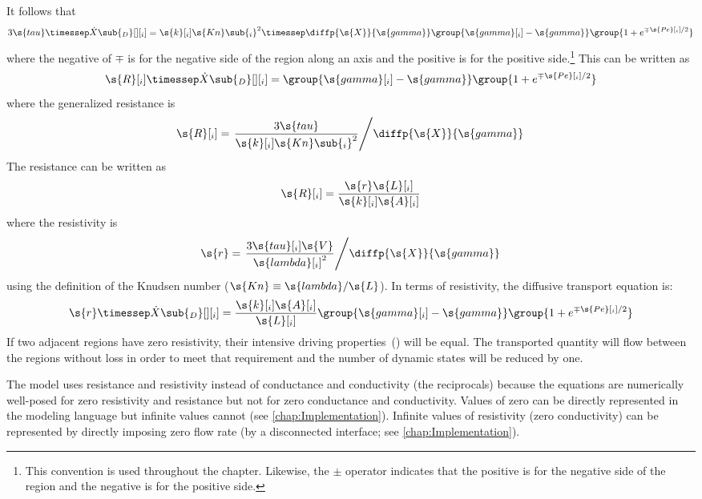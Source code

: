 It follows that
\begin{equation}
  \label{eq:DiffusiveTransport2}
  3\s{tau}\timessep\dot{X}\sub{_D}[ ][_i] = \s{k}[_i]\s{Kn}\sub{_i}^2\timessep\diffp{\s{X}}{\s{gamma}}\group{\s{gamma}[_i] - \s{gamma}}\group{1 + e^{\mp\s{Pe}[_i]/2}}
\end{equation}
where the negative of $\mp$ is for the negative side of the region along an axis and the positive is for the positive side.\footnote{This convention is used throughout the chapter.  Likewise, the $\pm$ operator indicates that the positive is for the negative side of the region and the negative is for the positive side.}  This can be written as
\begin{equation}
  \label{eq:DiffusiveTransport3}
  \s{R}[_i]\timessep\dot{X}\sub{_D}[ ][_i] = \group{\s{gamma}[_i] - \s{gamma}}\group{1 + e^{\mp\s{Pe}[_i]/2}}
\end{equation}
where the generalized resistance is
\begin{equation}
  \label{eq:Resistance1}
  \s{R}[_i]= \left.\frac{3\s{tau}}{\s{k}[_i]\s{Kn}\sub{_i}^2}\middle/\diffp{\s{X}}{\s{gamma}}\right.
\end{equation}
The resistance can be written as
\begin{equation}
  \label{eq:Resistance2}
  \s{R}[_i]= \frac{\s{r}\s{L}[_i]}{\s{k}[_i]\s{A}[_i]}
\end{equation}
where the resistivity is
\begin{equation}
  \label{eq:Resistivity}
  \s{r} = \left.\frac{3\s{tau}[_i]\s{V}}{\s{lambda}[_i]^2}\middle/\diffp{\s{X}}{\s{gamma}}\right.
\end{equation}
using the definition of the Knudsen number ($\s{Kn} \equiv \s{lambda}/\s{L}$).
In terms of resistivity, the diffusive transport equation is:
\begin{equation}
  \label{eq:DiffusiveTransport4}
  \s{r}\timessep\dot{X}\sub{_D}[ ][_i] = \frac{\s{k}[_i]\s{A}[_i]}{\s{L}[_i]}\group{\s{gamma}[_i] - \s{gamma}}\group{1 + e^{\mp\s{Pe}[_i]/2}}
\end{equation}
If two adjacent regions have zero resistivity, their intensive driving properties~() will be equal.  The transported quantity will flow between the regions without loss in order to meet that requirement and the number of dynamic states will be reduced by one.

The model uses resistance and resistivity instead of conductance and conductivity (the reciprocals) because the equations are numerically well-posed for zero resistivity and resistance but not for zero conductance and conductivity.  Values of zero can be directly represented in the modeling language but infinite values cannot (see \autoref{chap:Implementation}).  Infinite values of resistivity (zero conductivity) can be represented by directly imposing zero flow rate (by a disconnected interface; see \autoref{chap:Implementation}).

